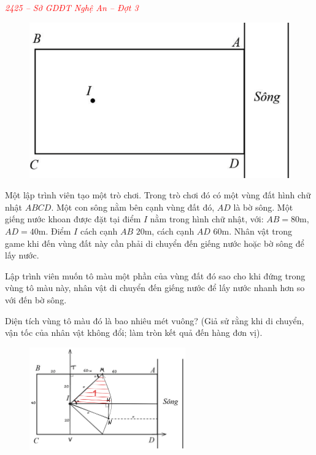 \documentclass[twoside,final]{hcmut-report}
\newcommand{\exercise}[1]{\begin{exercisebox}#1\end{exercisebox}}
\begin{document}
\exercise{
    \textcolor{red}{\textit{2425 -- Sở GDĐT Nghệ An -- Đợt 3}}

    \begin{figure}
        \centering
        \includegraphics*[width=1.03\linewidth]{images/Nghệ An 2025 - Đợt 3/NgheAn25-5.png}
    \end{figure}

    Một lập trình viên tạo một trò chơi. Trong trò chơi đó có một vùng đất hình chữ nhật $ABCD$. Một con sông nằm bên cạnh vùng đất đó, $AD$ là bờ sông. Một giếng nước khoan được đặt tại điểm $I$ nằm trong hình chữ nhật, với:
    $AB = 80$m, $AD = 40$m. Điểm $I$ cách cạnh $AB$ $20$m, cách cạnh $AD$ $60$m. Nhân vật trong game khi đến vùng đất này cần phải di chuyển đến giếng nước hoặc bờ sông để lấy nước.

    Lập trình viên muốn tô màu một phần của vùng đất đó sao cho khi đứng trong vùng tô màu này, nhân vật di chuyển đến giếng nước để lấy nước nhanh hơn so với đến bờ sông.

    Diện tích vùng tô màu đó là bao nhiêu mét vuông? (Giả sử rằng khi di chuyển, vận tốc của nhân vật không đổi; làm tròn kết quả đến hàng đơn vị).
}
\begin{figure}[H]
    \centering
    \includegraphics[width=0.6\textwidth]{images/Nghệ An 2025 - Đợt 3/NgheAn25-6.png}
\end{figure}
\end{document}
